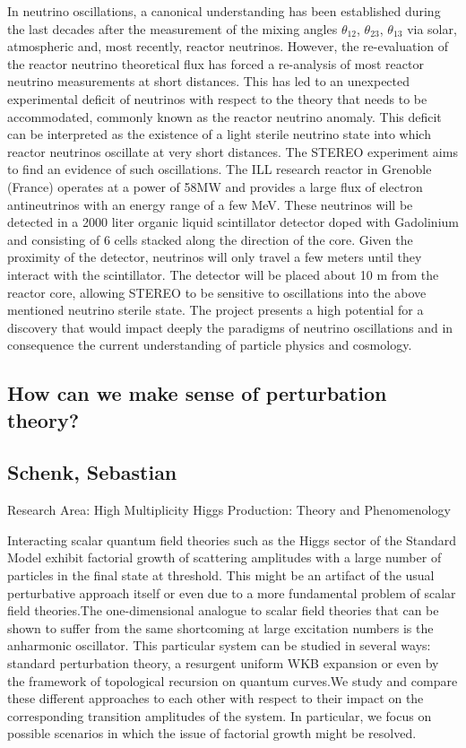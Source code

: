 \noindent In neutrino oscillations, a canonical understanding has been established during the last decades after the measurement of the mixing angles $\theta_{12}$, $\theta_{23}$, $\theta_{13}$ via solar, atmospheric and, most recently, reactor neutrinos. However, the re-evaluation of the reactor neutrino theoretical flux has forced a re-analysis of most reactor neutrino measurements
at short distances. This has led to an unexpected experimental deficit of neutrinos with respect to the theory that needs to be accommodated, commonly known as the reactor neutrino anomaly. This deficit can be interpreted as the existence of a light sterile neutrino state into which reactor neutrinos oscillate at very short distances. The STEREO experiment aims to find an evidence of such oscillations.\newline
The ILL research reactor in Grenoble (France) operates at a power of 58MW and provides a large flux of electron antineutrinos with an energy range of a few MeV. These neutrinos will be detected in a 2000 liter organic liquid scintillator detector doped with Gadolinium and consisting of 6 cells stacked along the direction of the core. Given the proximity of the detector, neutrinos will only travel a few meters until they interact with the scintillator. The detector will be placed
about 10 m from the reactor core, allowing STEREO to be sensitive to oscillations into the above mentioned neutrino sterile state. The project presents a high potential for a discovery that would impact deeply the paradigms of neutrino oscillations and in consequence the current understanding of particle physics and cosmology.
\newpage
\subsection*{\centering \large How can we make sense of perturbation theory?}
\subsection*{\centering \normalsize Schenk, Sebastian}
Research Area:  High Multiplicity Higgs Production: Theory and Phenomenology\newline

\noindent Interacting scalar quantum field theories such as the Higgs sector of the Standard Model exhibit factorial growth of scattering amplitudes with a large number of particles in the final state at threshold. This might be an artifact of the usual perturbative approach itself or even due to a more fundamental problem of scalar field theories.\newline The one-dimensional analogue to scalar field theories that can be shown to suffer from the same shortcoming at large excitation numbers is the anharmonic oscillator. This particular system can be studied in several ways: standard perturbation theory, a resurgent uniform WKB expansion or even by the framework of topological recursion on quantum curves.\newline We study and compare these different approaches to each other with respect to their impact on the corresponding transition amplitudes of the system. In particular, we focus on possible scenarios in which the issue of factorial growth might be resolved.

